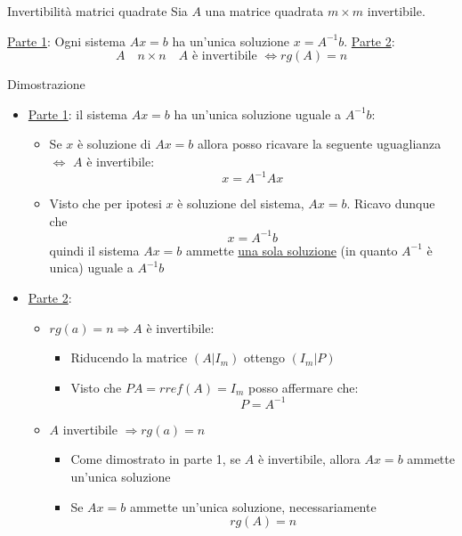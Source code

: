 \begin{teorema}{Invertibilità matrici quadrate }
	Sia $A$ una matrice quadrata $m \times m$ invertibile.

	\underline{Parte 1}: Ogni sistema $Ax = b$ ha un'unica soluzione $x = A^{-1}b$.
	\vskip3mm
	\underline{Parte 2}:
	\[
		A \quad  n\times n  \quad A \text{ è invertibile }  \Leftrightarrow rg\left( A \right) =n
	\]
\end{teorema}

Dimostrazione
\begin{itemize}
	\item \underline{Parte 1}: il sistema $Ax= b$ ha un'unica soluzione uguale a $A^{-1}b$:
	      \begin{itemize}
		      \item Se $x$ è soluzione di $Ax=b$ allora posso ricavare la seguente uguaglianza $\Leftrightarrow$ $A$ è invertibile:
		            \[
			            x =  A^{-1}Ax
		            \]
		      \item Visto che per ipotesi $x$ è soluzione del sistema, $Ax=b$. Ricavo dunque che
		            \[
			            x=A^{-1}b
		            \]
		            quindi il sistema  $Ax=b$ ammette \underline{una sola soluzione} (in quanto $A^{-1}$ è unica) uguale a $A^{-1}b$
	      \end{itemize}
	\item \underline{Parte 2}:
	      \begin{itemize}
		      \item $rg\left( a \right) = n \Rightarrow A$  è invertibile:
		            \begin{itemize}
			            \item Riducendo la matrice $\left( A|I_m \right) $ ottengo $\left( I_m|P \right) $
			            \item Visto che $PA = rref\left( A \right) = I_m$ posso affermare che:
			                  \[
				                  P=A^{-1}
			                  \]
		            \end{itemize}
		      \item $A$ invertibile $ \Rightarrow rg\left( a \right) =n$
		            \begin{itemize}
			            \item Come dimostrato in parte 1, se $A$ è invertibile, allora $Ax=b$ ammette un'unica soluzione
			            \item Se $Ax=b$ ammette un'unica soluzione, necessariamente
			                  \[
				                  rg\left( A \right) =n
			                  \]
		            \end{itemize}
	      \end{itemize}
\end{itemize}
